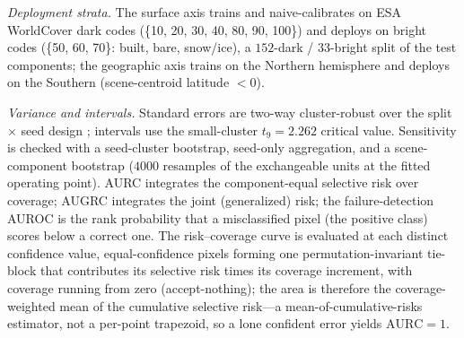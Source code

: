 \documentclass[preprint,3p,times]{elsarticle}
\begin{document}
\emph{Deployment strata.} The surface axis trains and naive-calibrates on ESA WorldCover \citep{zanaga2021worldcover} dark codes (\{10, 20, 30, 40, 80, 90, 100\}) and deploys on bright codes (\{50, 60, 70\}: built, bare, snow/ice), a $152$-dark / $33$-bright split of the test components; the geographic axis trains on the Northern hemisphere and deploys on the Southern (scene-centroid latitude $<0$).

\emph{Variance and intervals.} Standard errors are two-way cluster-robust over the split $\times$ seed design \citep{cameron2011}; intervals use the small-cluster $t_9 = 2.262$ critical value. Sensitivity is checked with a seed-cluster bootstrap, seed-only aggregation, and a scene-component bootstrap ($4000$ resamples of the exchangeable units at the fitted operating point). AURC integrates the component-equal selective risk over coverage; AUGRC integrates the joint (generalized) risk; the failure-detection AUROC is the rank probability that a misclassified pixel (the positive class) scores below a correct one. The risk--coverage curve is evaluated at each distinct confidence value, equal-confidence pixels forming one permutation-invariant tie-block that contributes its selective risk times its coverage increment, with coverage running from zero (accept-nothing); the area is therefore the coverage-weighted mean of the cumulative selective risk---a mean-of-cumulative-risks estimator, not a per-point trapezoid, so a lone confident error yields $\mathrm{AURC}=1$.
\end{document}
